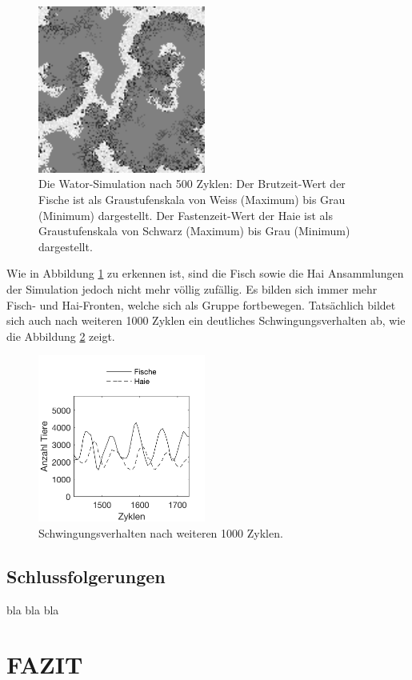 \documentclass[a4paper,twoside]{article}
\begin{document}
	\begin{figure}[!h]
  		\centering
 		\includegraphics[width=5.5cm]{Diagramme/wator_image_100.png}
  		\caption{Die Wator-Simulation nach 500 Zyklen: Der Brutzeit-Wert der Fische ist als Graustufenskala von Weiss (Maximum) bis Grau (Minimum) dargestellt. Der Fastenzeit-Wert der Haie ist als Graustufenskala von Schwarz (Maximum) bis Grau (Minimum) dargestellt. }
  		\label{fig:wator_image_100}
	\end{figure}
	
	Wie in Abbildung \ref{fig:wator_image_100} zu erkennen ist, sind die Fisch sowie die Hai Ansammlungen der Simulation jedoch nicht mehr völlig zufällig. Es bilden sich immer mehr Fisch- und Hai-Fronten, welche sich als Gruppe fortbewegen. Tatsächlich bildet sich auch nach weiteren 1000 Zyklen ein deutliches Schwingungsverhalten ab, wie die Abbildung \ref{fig:wator_diagram_348} zeigt.
	\begin{figure}[!h]
  		\centering
 		\includegraphics[width=5.5cm]{Diagramme/wator_diagram_348.png}
  		\caption{Schwingungsverhalten nach weiteren 1000 Zyklen.}
  		\label{fig:wator_diagram_348}
	\end{figure}

	\newpage

	\subsection{Schlussfolgerungen}
	bla bla bla

	\section{\uppercase{Fazit}}

	\vfill
	
	{\small
	}
\end{document}
